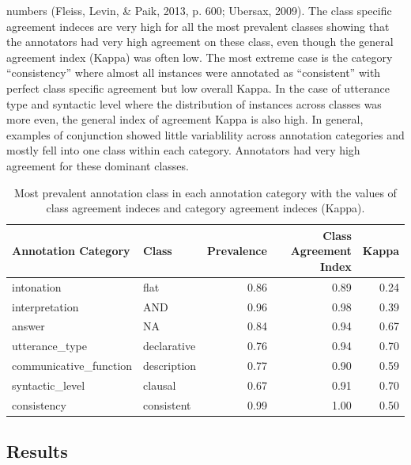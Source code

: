 \documentclass[oneside]{report}
\theoremstyle{definition}
\theoremstyle{definition}
\theoremstyle{definition}
\theoremstyle{remark}
\begin{document}
numbers (Fleiss, Levin, \& Paik, 2013, p. 600; Ubersax, 2009). The class
specific agreement indeces are very high for all the most prevalent
classes showing that the annotators had very high agreement on these
class, even though the general agreement index (Kappa) was often low.
The most extreme case is the category ``consistency'' where almost all
instances were annotated as ``consistent'' with perfect class specific
agreement but low overall Kappa. In the case of utterance type and
syntactic level where the distribution of instances across classes was
more even, the general index of agreement Kappa is also high. In
general, examples of conjunction showed little variablility across
annotation categories and mostly fell into one class within each
category. Annotators had very high agreement for these dominant classes.
\begin{table}

\caption{\label{tab:andAgreeStats}Most prevalent annotation class in each annotation category with the values of class agreement indeces and category agreement indeces (Kappa).}
\centering
\begin{tabular}[t]{l|l|r|r|r}
\hline
Annotation Category & Class & Prevalence & Class Agreement Index & Kappa\\
\hline
intonation & flat & 0.86 & 0.89 & 0.24\\
\hline
interpretation & AND & 0.96 & 0.98 & 0.39\\
\hline
answer & NA & 0.84 & 0.94 & 0.67\\
\hline
utterance\_type & declarative & 0.76 & 0.94 & 0.70\\
\hline
communicative\_function & description & 0.77 & 0.90 & 0.59\\
\hline
syntactic\_level & clausal & 0.67 & 0.91 & 0.70\\
\hline
consistency & consistent & 0.99 & 1.00 & 0.50\\
\hline
\end{tabular}
\end{table}
\subsection{Results}\label{results-3}
\end{document}
